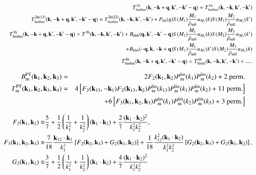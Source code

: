 \documentclass[onecolumn,notitlepage,showpacs,amsmath,amssymb,prd,floatfix]{revtex4-1}
\newcommand{\bk}{{\bf k}}
\newcommand{\bq}{{\bf q}}
\begin{document}
\begin{eqnarray}
 &&T^{\rm 1h}_{\rm hmhm}(\bk,-\bk+\bq,\bk',-\bk'-\bq)\simeq
  T^{\rm 1h}_{\rm hmhm}(\bk,-\bk,\bk',-\bk')\\
 &&T^{\rm 2h(13)}_{\rm hmhm}(\bk,-\bk+\bq,\bk',-\bk'-\bq)
  \simeq T^{\rm 2h(22)}_{\rm hmhm}(\bk,-\bk,\bk',-\bk')
  +P_{\rm hh}(q)S(M_1)\frac{M_1}{\bar{\rho}_{\rm m0}}u_{M_1}(k)
  S(M_2)\frac{M_2}{\bar{\rho}_{\rm m0}}u_{M_2}(k')
\\
 &&T^{\rm 3h}_{\rm hmhm}(\bk,-\bk+\bq,\bk',-\bk'-\bq)
  \simeq T^{\rm 3h}(\bk,-\bk,\bk',-\bk')
  +B_{\rm hhh}(\bq,\bk',-\bk'-\bq)S(M_1)\frac{M_1}{\bar{\rho}_{\rm
  m0}}u_{M_1}(k)
  S(M_2)\frac{M_3}{\bar{\rho}_{\rm m0}}u_{M_3}(k')\nonumber\\
 &&\hspace{18em}+B_{\rm hhh}(-\bq,\bk,-\bk+\bq)
  S(M_1)\frac{M_1}{\bar{\rho}_{\rm
  m0}}u_{M_1}(k')S(M_2)\frac{M_3}{\bar{\rho}_{\rm m0}}u_{M_3}(k)\\
 &&T^{\rm 4h}_{\rm hmhm}(\bk,-\bk+\bq,\bk',-\bk'-\bq)
  \simeq T^{4h}_{\rm hhhh}(\bk,-\bk,\bk',-\bk')+.....
\end{eqnarray}

\begin{eqnarray}
B^{\rm PT}_{\rm m}(\bk_1,\bk_2,\bk_3)&=&2F_2(\bk_1,\bk_2)
  P^{\rm lin}_{\rm m}(k_1)P^{\rm lin}_{\rm m}(k_2)+2~{\rm perm.}\nonumber\\
T^{\rm PT}_{\rm m}(\bk_1,\bk_2,\bk_3,\bk_4)&=&
  4\left[F_2(\bk_{13},-\bk_1)F_2(\bk_{13},\bk_2)
    P^{\rm lin}_{\rm m}(k_{13})
    P^{\rm lin}_{\rm m}(k_{1})
    P^{\rm lin}_{\rm m}(k_{2})
 +11~{\rm perm.}\right]\nonumber \\
 &&+6\left[
      F_3(\bk_1,\bk_2,\bk_3)
          P^{\rm lin}_{\rm m}(k_{1})
          P^{\rm lin}_{\rm m}(k_{2})
          P^{\rm lin}_{\rm m}(k_{3})+3~{\rm perm.}
     \right]
\end{eqnarray}

\begin{align}
F_2(\bk_1,\bk_2) \equiv &\frac{5}{7}+\frac{1}{2}
\left(\frac{1}{k_1^2}+\frac{1}{k_2^2}\right)(\bk_1\cdot\bk_2)
+\frac{2}{7}\frac{(\bk_1\cdot\bk_2)^2}{k_1^2k_2^2},\nonumber\\
F_3(\bk_1,\bk_2,\bk_3) \equiv &
 \frac{7}{18}\frac{\bk_{12}\cdot\bk_1}{k_1^2}
 \left[F_2(\bk_2,\bk_3)+G_2(\bk_1,\bk_2)\right]
+\frac{1}{18}\frac{k_{12}^2(\bk_1\cdot\bk_2)}{k_1^2k_2^2}
\left[G_2(\bk_2,\bk_3)+G_2(\bk_1,\bk_2)\right], \nonumber\\
G_2(\bk_1,\bk_2)\equiv & \frac{3}{7}+\frac{1}{2}
\left(\frac{1}{k_1^2}+\frac{1}{k_2^2}\right)
(\bk_1\cdot\bk_2)+
\frac{4}{7}\frac{(\bk_1\cdot\bk_2)^2}{k_1^2k_2^2}
\end{align}
\end{document}
